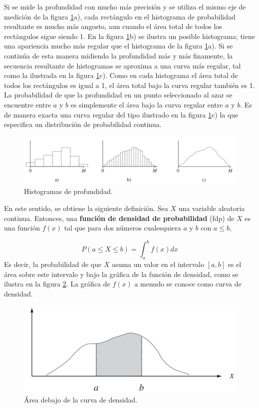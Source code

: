 \documentclass[
  11pt,
]{book}
\theoremstyle{definition}
\theoremstyle{definition}
\theoremstyle{definition}
\theoremstyle{definition}
\theoremstyle{remark}
\begin{document}
Si se mide la profundidad con mucho más precisión y se utiliza el mismo eje de medición de la figura \ref{fig:densidad}a), cada rectángulo en el histograma de probabilidad resultante es mucho más angosto, aun cuando el área total de todos los rectángulos sigue siendo 1. En la figura \ref{fig:densidad}b) se ilustra un posible histograma; tiene una apariencia mucho más regular que el histograma de la figura \ref{fig:densidad}a). Si se continúa de esta manera midiendo la profundidad más y más finamente, la secuencia resultante de histogramas se aproxima a una curva más regular, tal como la ilustrada en la figura \ref{fig:densidad}c). Como en cada histograma el área total de todos los rectángulos es igual a 1, el área total bajo la curva regular también es 1. La probabilidad de que la profundidad en un punto seleccionado al azar se encuentre entre \(a\) y \(b\) es simplemente el área bajo la curva regular entre \(a\) y \(b\). Es de manera exacta una curva regular del tipo ilustrado en la figura \ref{fig:densidad}c) la que especifica un distribución de probabilidad continua.

\begin{figure}

{\centering \includegraphics[width=1\linewidth]{material/img/densidad} 

}

\caption{Histogramas de profundidad.}\label{fig:densidad}
\end{figure}

En este sentido, se obtiene la siguiente definición. Sea \(X\) una variable aleatoria continua. Entonces, una \textbf{función de densidad de probabilidad} (fdp) de \(X\) es una función \(f(x)\) tal que para dos números cualesquiera \(a\) y \(b\) con \(a \leq b\),

\[
P(a\leq X\leq b) = \int_a^b f(x)dx
\]
Es decir, la probabilidad de que \(X\) asuma un valor en el intervalo \([a, b]\) es el área sobre este intervalo y bajo la gráfica de la función de densidad, como se ilustra en la figura \ref{fig:densidad2}. La gráfica de \(f(x)\) a menudo se conoce como curva de densidad.

\begin{figure}

{\centering \includegraphics[width=0.7\linewidth]{material/img/densidad2} 

}

\caption{Área debajo de la curva de densidad.}\label{fig:densidad2}
\end{figure}
\end{document}
